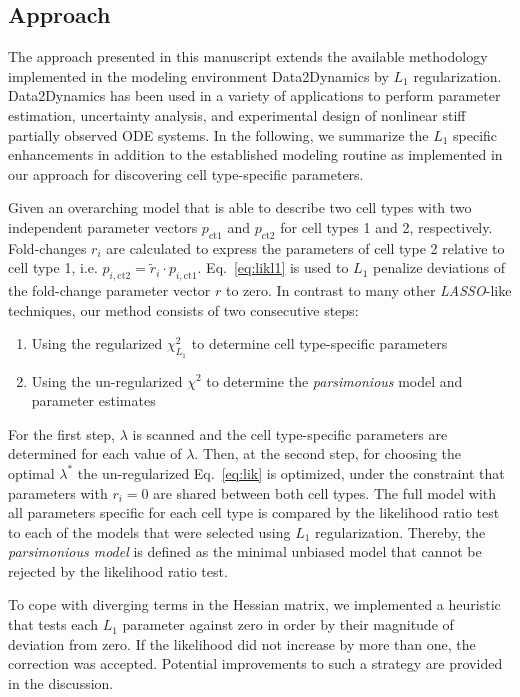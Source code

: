 \documentclass{bioinfo}
\begin{document}
\begin{methods}
\section{Approach}
The approach presented in this manuscript extends the available methodology implemented in the modeling environment Data2Dynamics \citep{Raue2015} by $L_1$ regularization.
Data2Dynamics has been used in a variety of applications \citep{Becker1404,Bachmann516,Beer2014} to perform parameter estimation, uncertainty analysis, and experimental design of nonlinear stiff partially observed ODE systems.
In the following, we summarize the $L_1$ specific enhancements in addition to the established modeling routine as implemented in our approach for discovering cell type-specific parameters.

Given an overarching model that is able to describe two cell types with two independent parameter vectors $p_\text{ct1}$ and $p_\text{ct2}$ for cell types 1 and 2, respectively.
Fold-changes $r_i$ are calculated to express the parameters of cell type 2 relative to cell type 1, i.e. $p_{i,\text{ct2}} = \tilde r_i \cdot p_{i,\text{ct1}}$.
Eq.~\ref{eq:likl1} is used to $L_1$ penalize deviations of the fold-change parameter vector $r$ to zero.
In contrast to many other \emph{LASSO}-like techniques, our method consists of two consecutive steps:
\begin{enumerate}
\item Using the regularized $\chi^2_{L_1}$ to determine cell type-specific parameters 
\item Using the un-regularized $\chi^2$ to determine the \emph{parsimonious} model and parameter estimates 
\end{enumerate}
For the first step, $\lambda$ is scanned and the cell type-specific parameters are determined for each value of $\lambda$.
Then, at the second step, for choosing the optimal $\lambda^*$ the un-regularized Eq.~\ref{eq:lik} is optimized, under the constraint that parameters with $r_i = 0$ are shared between both cell types.
The full model with all parameters specific for each cell type is compared by the likelihood ratio test to each of the models that were selected using $L_1$ regularization.
Thereby, the \emph{parsimonious model} is defined as the minimal unbiased model that cannot be rejected by the likelihood ratio test.

To cope with diverging terms in the Hessian matrix, we implemented a heuristic that tests each $L_1$ parameter against zero in order by their magnitude of deviation from zero.
If the likelihood did not increase by more than one, the correction was accepted.
Potential improvements to such a strategy are provided in the discussion.


\end{methods}
\end{document}
